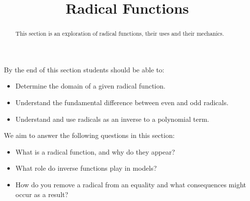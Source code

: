 \documentclass{ximeraXloud}
\title{Radical Functions}
\begin{document}
\begin{abstract}
    This section is an exploration of radical functions, their uses and their mechanics.
\end{abstract}
\maketitle
By the end of this section students should be able to:

\begin{itemize}
    \item Determine the domain of a given radical function.
    \item Understand the fundamental difference between even and odd radicals.
    \item Understand and use radicals as an inverse to a polynomial term.
\end{itemize}

We aim to answer the following questions in this section:

\begin{itemize}
    \item What is a radical function, and why do they appear?\\
    \item What role do inverse functions play in models?\\
    \item How do you remove a radical from an equality and what consequences might occur as a result?
\end{itemize}
\end{document}
